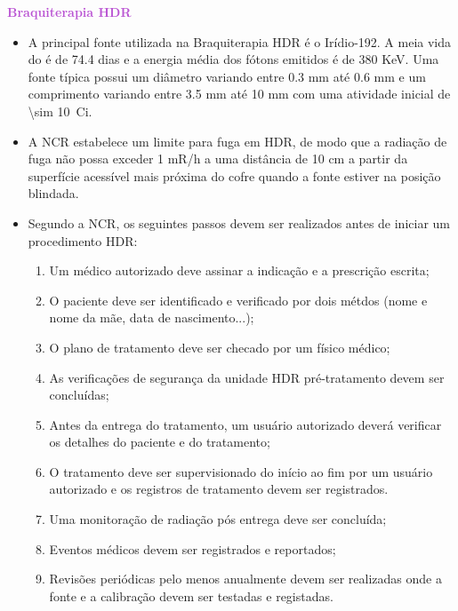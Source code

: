 \documentclass[11pt,a4paper]{article}
\newcounter{exemplo}
\begin{document}
\begin{exemplo}[Braquiterapia]
\begin{itemize}
    \end{itemize}

    \textcolor{MediumOrchid}{\LobsterTwo\textbf{Braquiterapia HDR}}
    \begin{itemize}
        \item A principal fonte utilizada na Braquiterapia HDR é o Irídio-192. A meia vida do  é de 74.4 dias e a energia média dos fótons emitidos é de 380 KeV. Uma fonte típica possui um diâmetro variando entre 0.3 mm até 0.6 mm e um comprimento variando entre 3.5 mm até 10 mm com uma atividade inicial de \qty{\sim 10}{Ci}.
        
        \item A NCR estabelece um limite para fuga em HDR, de modo que a radiação de fuga não possa exceder 1 mR/h a uma distância de 10 cm a partir da superfície acessível mais próxima do cofre quando a fonte estiver na posição blindada. 
        
        \item Segundo a NCR, os seguintes passos devem ser realizados antes de iniciar um procedimento HDR:
        
            \begin{enumerate}[label=\textcolor{CarnationPink}{\roman*.}]
                \item Um médico autorizado deve assinar a indicação e a prescrição escrita;
                \item O paciente deve ser identificado e verificado por dois métdos (nome e nome da mãe, data de nascimento...);
                \item O plano de tratamento deve ser checado por um físico médico;
                \item As verificações de segurança da unidade HDR pré-tratamento devem ser concluídas;
                \item Antes da entrega do tratamento, um usuário autorizado deverá verificar os detalhes do paciente e do tratamento;
                \item O tratamento deve ser supervisionado do início ao fim por um usuário autorizado e os registros de tratamento devem ser registrados.
                \item Uma monitoração de radiação pós entrega deve ser concluída;
                \item Eventos médicos devem ser registrados e reportados;
                \item Revisões periódicas pelo menos anualmente devem ser realizadas onde a fonte e a calibração devem ser testadas e registadas. 
            \end{enumerate}


\end{itemize}
\end{exemplo}
\end{document}

